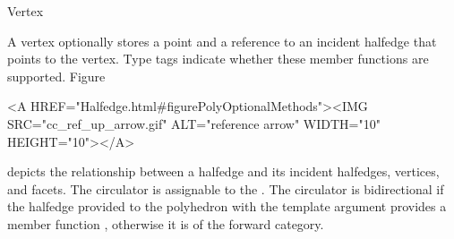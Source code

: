 
\ccRefPageBegin



\begin{ccRefClass}{Vertex}

\ccDefinition
  
A vertex optionally stores a point and a reference to an incident
halfedge that points to the vertex.  Type tags indicate whether these
member functions are supported.  
Figure~\begin{ccHtmlOnly}
  <A HREF="Halfedge.html#figurePolyOptionalMethods"><IMG 
  SRC="cc_ref_up_arrow.gif" ALT="reference arrow" WIDTH="10" HEIGHT="10"></A>
\end{ccHtmlOnly}
depicts the relationship between a halfedge and its incident
halfedges, vertices, and facets. The circulator is assignable to the
. The circulator is bidirectional if the
halfedge provided to the polyhedron with the  template
argument provides a member function , otherwise it is
of the forward category.



\ccTypes
{}
\ccThreeToTwo

\ccGlue
{}
\ccGlue
{}

\ccGlue
{}
\ccGlue
{}
\ccGlue
{}

\ccGlue
{}
\ccGlue
{}
\ccGlue
{}


\end{ccRefClass}
